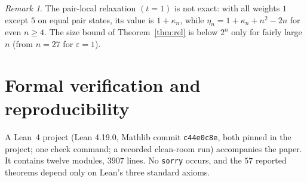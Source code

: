 \documentclass[11pt]{amsart}
\theoremstyle{plain}
\theoremstyle{definition}
\theoremstyle{remark}
\newtheorem{remark}[theorem]{Remark}
\newcommand{\code}[1]{\texttt{#1}}
\begin{document}
\begin{remark}
The pair-local relaxation $(t=1)$ is not exact: with all weights $1$ except $5$ on equal pair states, its value is
$1+\kappa_n$, while $\eta_n=1+\kappa_n+n^2-2n$ for even $n\ge4$. The size bound of Theorem~\ref{thm:rel} is below $2^n$
only for fairly large $n$ (from $n=27$ for $\varepsilon=1$).
\end{remark}

\section{Formal verification and reproducibility}\label{sec:formal}
A Lean~4 project (Lean 4.19.0, Mathlib commit \code{c44e0c8e}, both pinned in the project; one check command; a
recorded clean-room run) accompanies the paper. It contains twelve modules, $3907$ lines. No \code{sorry} occurs, and
the $57$ reported theorems depend only on Lean's three standard axioms.
\end{document}
